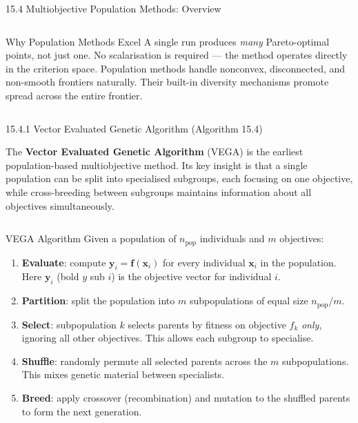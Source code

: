 \documentclass[aspectratio=169,10pt]{beamer}
\newcommand{\bx}{\mathbf{x}}
\newcommand{\by}{\mathbf{y}}
\newcommand{\bff}{\mathbf{f}}
\begin{document}
\begin{frame}[allowframebreaks]{15.4 Multiobjective Population Methods: Overview}
\begin{columns}
\begin{exampleblock}{Why Population Methods Excel}
  A single run produces \emph{many} Pareto-optimal points, not just one.
  No scalarisation is required --- the method operates directly in the
  criterion space.  Population methods handle nonconvex, disconnected, and
  non-smooth frontiers naturally.  Their built-in diversity mechanisms
  promote spread across the entire frontier.
\end{exampleblock}
\end{columns}

\end{frame}

\begin{frame}[allowframebreaks]{15.4.1 Vector Evaluated Genetic Algorithm (Algorithm 15.4)}

The \textbf{Vector Evaluated Genetic Algorithm} (VEGA) is the earliest
population-based multiobjective method.  Its key insight is that a
single population can be split into specialised subgroups, each focusing on
one objective, while cross-breeding between subgroups maintains information
about all objectives simultaneously.

\begin{columns}
\begin{block}{VEGA Algorithm}
  Given a population of $n_{\text{pop}}$ individuals and $m$ objectives:
  \begin{enumerate}
    \item \textbf{Evaluate}: compute $\by_i = \bff(\bx_i)$ for every
      individual $\bx_i$ in the population.  Here $\by_i$ (bold $y$ sub $i$)
      is the objective vector for individual $i$.

    \item \textbf{Partition}: split the population into $m$ subpopulations of
      equal size $n_{\text{pop}} / m$.

    \item \textbf{Select}: subpopulation $k$ selects parents by fitness on
      objective $f_k$ \emph{only}, ignoring all other objectives.  This
      allows each subgroup to specialise.

    \item \textbf{Shuffle}: randomly permute all selected parents across
      the $m$ subpopulations.  This mixes genetic material between
      specialists.

    \item \textbf{Breed}: apply crossover (recombination) and mutation to
      the shuffled parents to form the next generation.
  \end{enumerate}
\end{block}


\end{columns}
\end{frame}
\end{document}
